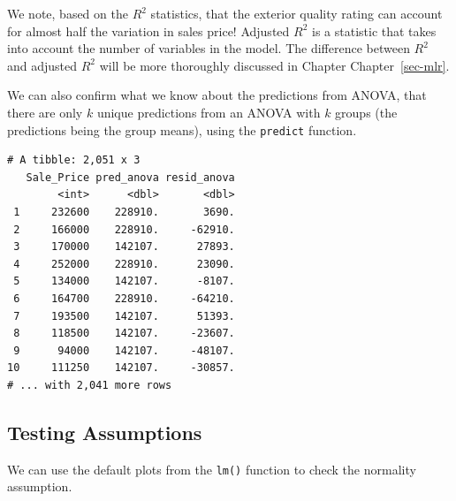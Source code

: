 \documentclass[
  letterpaper,
  DIV=11,
  numbers=noendperiod]{scrreprt}
\newenvironment{Shaded}{\begin{snugshade}}{\end{snugshade}}
\newcommand{\AttributeTok}[1]{\textcolor[rgb]{0.40,0.45,0.13}{#1}}
\newcommand{\FunctionTok}[1]{\textcolor[rgb]{0.28,0.35,0.67}{#1}}
\newcommand{\NormalTok}[1]{\textcolor[rgb]{0.00,0.23,0.31}{#1}}
\newcommand{\OtherTok}[1]{\textcolor[rgb]{0.00,0.23,0.31}{#1}}
\newcommand{\SpecialCharTok}[1]{\textcolor[rgb]{0.37,0.37,0.37}{#1}}
\begin{document}
We note, based on the \(R^2\) statistics, that the exterior quality
rating can account for almost half the variation in sales price!
Adjusted \(R^2\) is a statistic that takes into account the number of
variables in the model. The difference between \(R^2\) and adjusted
\(R^2\) will be more thoroughly discussed in Chapter
Chapter~\ref{sec-mlr}.

We can also confirm what we know about the predictions from ANOVA, that
there are only \(k\) unique predictions from an ANOVA with \(k\) groups
(the predictions being the group means), using the \texttt{predict}
function.

\begin{Shaded}
\end{Shaded}

\begin{verbatim}
# A tibble: 2,051 x 3
   Sale_Price pred_anova resid_anova
        <int>      <dbl>       <dbl>
 1     232600    228910.       3690.
 2     166000    228910.     -62910.
 3     170000    142107.      27893.
 4     252000    228910.      23090.
 5     134000    142107.      -8107.
 6     164700    228910.     -64210.
 7     193500    142107.      51393.
 8     118500    142107.     -23607.
 9      94000    142107.     -48107.
10     111250    142107.     -30857.
# ... with 2,041 more rows
\end{verbatim}

\hypertarget{testing-assumptions}{%
\subsection{Testing Assumptions}\label{testing-assumptions}}

We can use the default plots from the \texttt{lm()} function to check
the normality assumption.
\end{document}
